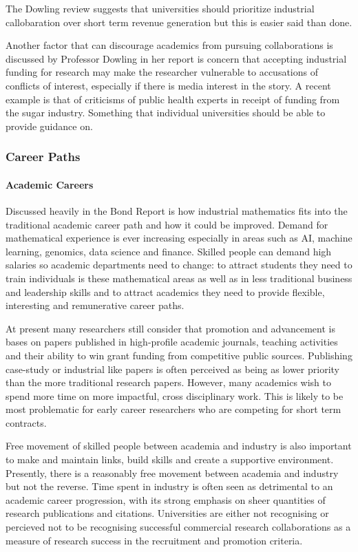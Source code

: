 \documentclass[11pt]{article} %
\begin{document}
	 The Dowling review \cite{DOWLING2015} suggests that universities should prioritize industrial callobaration over short term revenue generation but this is easier said than done. 
	
	Another factor that can discourage academics from pursuing collaborations is discussed by Professor Dowling in her report \cite{DOWLING2015} is concern that accepting industrial funding for research may make the researcher vulnerable to accusations of conflicts of interest, especially if there is media interest in the story. A recent example is that of  criticisms of public health experts in receipt of funding from the sugar industry. Something that individual universities should be able to provide guidance on. 
	\subsubsection{Career Paths} 
	\paragraph{Academic Careers}
	
	
	Discussed heavily in the Bond Report is  how industrial mathematics fits into the traditional academic career path and how it could be improved. Demand for mathematical experience is ever increasing especially in areas such as AI, machine learning, genomics, data science and finance. Skilled people can demand high salaries so academic departments need to change: to attract students they need to train individuals is these mathematical areas as well as in less traditional business and leadership skills and to attract academics they need to provide flexible, interesting  and remunerative career paths.
	
	At present many researchers still consider that promotion and advancement is bases on papers published in high-profile academic journals, teaching activities and their ability to win grant funding from competitive public sources. Publishing case-study or industrial like papers is often perceived as being as lower priority than the more traditional research papers. However, many academics wish to spend more time on more impactful, cross disciplinary work. This is likely to be most problematic for early career researchers who are competing for short term contracts. 
	
	Free movement of skilled people between academia and industry is also important to make and maintain links, build skills and create a supportive environment. Presently, there is a reasonably free movement between academia and industry but not the reverse. Time spent in industry is often seen as detrimental to an academic career progression, with its strong emphasis on sheer quantities of research publications and citations.  Universities are either not recognising or percieved not to be recognising successful commercial research collaborations as a measure of research success in the recruitment and promotion criteria. 
	
\end{document}
